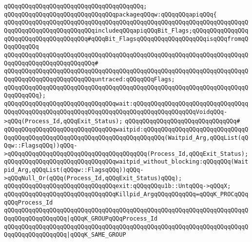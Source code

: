 \verb|qQQqqQQqqQQqqQQqqQQqqQQqqQQqqQQqqQQqqQQq;|\newline
\newline
\verb|qQQqqQQqqQQqqQQqqQQqqQQqqQQqqQQqpackageqQQqw:qQQqqQQqapiqQQq{|\newline
\verb|qQQqqQQqqQQqqQQqqQQqqQQqqQQqqQQqqQQqqQQqqQQqqQQqqQQqqQQqqQQqqQQqqQQqqQQqqQQqqQQqqQQqqQQqqQQqqQQqincludeqQQqapiqQQqBit_Flags;qQQqqQQqqQQqqQQqqQQqqQQqqQQqqQQqqQQqqQQq#qQQqBit_FlagsqQQqqQQqqQQqqQQqqQQqisqQQqfromqQQqqQQqqQQq|\newline
\verb|qQQqqQQqqQQqqQQqqQQqqQQqqQQqqQQqqQQqqQQqqQQqqQQqqQQqqQQqqQQqqQQqqQQqqQQqqQQqqQQqqQQqqQQqqQQqqQQq#|\newline
\verb|qQQqqQQqqQQqqQQqqQQqqQQqqQQqqQQqqQQqqQQqqQQqqQQqqQQqqQQqqQQqqQQqqQQqqQQqqQQqqQQqqQQqqQQqqQQqqQQquntraced:qQQqqQQqFlags;|\newline
\verb|qQQqqQQqqQQqqQQqqQQqqQQqqQQqqQQqqQQqqQQqqQQqqQQqqQQqqQQqqQQqqQQqqQQqqQQqqQQqqQQq};|\newline
\newline
\verb|qQQqqQQqqQQqqQQqqQQqqQQqqQQqqQQqwait:qQQqqQQqqQQqqQQqqQQqqQQqqQQqqQQqqQQqqQQqqQQqqQQqqQQqqQQqqQQqqQQqqQQqqQQqqQQqqQQqqQQqqQQqVoidqQQq->qQQq(Process_Id,qQQqExit_Status);|\newline
\verb|qQQqqQQqqQQqqQQqqQQqqQQqqQQqqQQq#|\newline
\verb|qQQqqQQqqQQqqQQqqQQqqQQqqQQqqQQqwaitpid:qQQqqQQqqQQqqQQqqQQqqQQqqQQqqQQqqQQqqQQqqQQqqQQqqQQqqQQqqQQqqQQqqQQqqQQqqQQq(Waitpid_Arg,qQQqList(qQQqw::FlagsqQQq))qQQq->qQQqqQQqqQQqqQQqqQQqqQQqqQQqqQQqqQQqqQQq(Process_Id,qQQqExit_Status);|\newline
\verb|qQQqqQQqqQQqqQQqqQQqqQQqqQQqqQQqwaitpid_without_blocking:qQQqqQQq(Waitpid_Arg,qQQqList(qQQqw::FlagsqQQq))qQQq->qQQqNull_Or(qQQq(Process_Id,qQQqExit_Status)qQQq);|\newline
\newline
\verb|qQQqqQQqqQQqqQQqqQQqqQQqqQQqqQQqexit:qQQqqQQqu1b::UntqQQq->qQQqX;|\newline
\newline
\verb|qQQqqQQqqQQqqQQqqQQqqQQqqQQqqQQqKillpid_ArgqQQqqQQqqQQq=qQQqK_PROCqQQqqQQqProcess_Id|\newline
\verb|qQQqqQQqqQQqqQQqqQQqqQQqqQQqqQQqqQQqqQQqqQQqqQQqqQQqqQQqqQQqqQQqqQQqqQQqqQQqqQQqqQQqqQQq|\verb#|qQQqK_GROUPqQQqProcess_Id#\newline
\verb|qQQqqQQqqQQqqQQqqQQqqQQqqQQqqQQqqQQqqQQqqQQqqQQqqQQqqQQqqQQqqQQqqQQqqQQqqQQqqQQqqQQqqQQq|\verb#|qQQqK_SAME_GROUP#\newline
